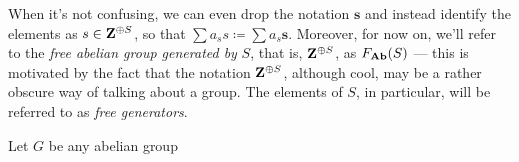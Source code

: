 \begin{notation}
When it's not confusing, we can even drop the notation \(\mathbf{s}\) and
instead identify the elements as \(s \in \mathbf{Z}^{\oplus S}\), so that
\(\sum a_s s \coloneq \sum a_s \mathbf{s}\). Moreover, for now on, we'll refer
to the \emph{free abelian group generated by} \(S\), that is, \(\mathbf{Z}^{\oplus S}\),
as \(F_{{\textbf{Ab}}}(S)\) --- this is motivated by the fact that the notation
\(\mathbf{Z}^{\oplus S}\), although cool, may be a rather obscure way of talking about a
group. The elements of \(S\), in particular, will be referred to as \emph{free
  generators}.
\end{notation}

\begin{proposition}
\label{prop:Ab-isomorphic-factor-of-free}
Let \(G\) be any abelian group
\end{proposition}


